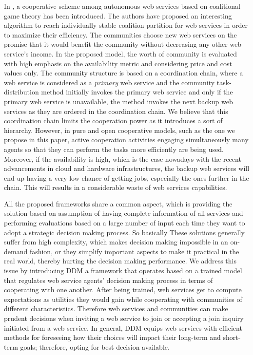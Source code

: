 \documentclass[10pt,journal,cspaper,compsoc]{IEEEtran}
\begin{document}
In \cite{10.1109/TSC.2012.12}, a cooperative scheme among
autonomous web services based on coalitional game theory has been
introduced. The authors have proposed an interesting algorithm to
reach individually stable coalition partition for web services in
order to maximize their efficiency. The communities choose new web
services on the promise that it would benefit the community
without decreasing any other web service's income. In the proposed
model, the worth of community is evaluated with high emphasis on
the availability metric and considering price and cost values
only. The community structure is based on a coordination chain,
where a web service is considered as a \emph{primary} web service
and the community task-distribution method initially invokes the
primary web service and only if the primary web service is
unavailable, the method invokes the next backup web services as
they are ordered in the coordination chain. We believe that this
coordination chain limits the cooperation power as it introduces a
sort of hierarchy. However, in pure and open cooperative models,
such as the one we propose in this paper, active cooperation
activities engaging simultaneously many agents so that they can
perform the tasks more efficiently are being used. Moreover, if
the availability is high, which is the case nowadays with the
recent advancements in cloud and hardware infrastructures, the
backup web services will end-up having a very low chance of
getting jobs, especially the ones further in the chain. This will
results in a considerable waste of web services capabilities.

All the proposed frameworks share a common aspect, which is providing the solution based on assumption of having complete information of all services and performing evaluations based on a large number of input each time they want to adopt a strategic decision making process. 
So basically These solutions generally suffer from high complexity, which makes decision making impossible in an on-demand fashion, or they simplify important aspects to make it practical in the real world, thereby hurting the decision making performance. We address this issue by introducing DDM a framework that operates based on a trained model that regulates web service agents' decision making process in terms of cooperating with one another. After being trained, web services get to compute expectations as utilities they would gain while cooperating with communities of different characteristics. Therefore web services and communities can make prudent decisions when inviting a web service to join or accepting a join inquiry initiated from a web service. In general, DDM equips web services with efficient methods for foreseeing how their choices will impact their long-term and short-term goals; therefore, opting for best decision available. 
\end{document}
